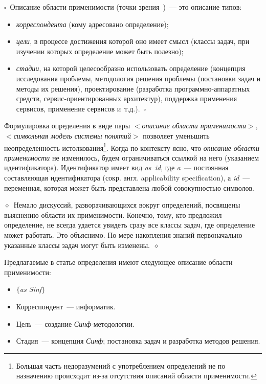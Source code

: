 \begin{multicols}{2}
\noindent
$\square$~Описание области применимости (точки зрения~\cite{7il})~--- это
описание типов:
\begin{itemize}
\item \textit{корреспондента} (кому адресовано определение);
\item \textit{цели}, в процессе достижения которой оно имеет смысл (классы
задач, при изучении которых определение может быть полезно);
\item \textit{стадии}, на которой целесообразно использовать определение
(концепция исследования проблемы, методология решения проблемы
(постановки задач и методы их решения), проектирование (разработка
программно-аппаратных средств, сервис-ориентированных архитектур),
поддержка применения сервисов, применение сервисов и~т.д.).~$\square$
\end{itemize}

Формулировка определения в виде пары $<$\textit{описание области применимости}$>$,
$<$\textit{сим\-воль\-ная модель системы понятий}$>$ позволяет уменьшить неопределенность
истолкования\footnote{Большая часть недоразумений с употреблением определений не по
назначению происходит из-за отсутствия описаний области применимости.}. Когда по контексту
ясно, что \textit{описание области применимости} не изменилось, будем ограничиваться ссылкой на него
(указанием идентификатора). Идентификатор имеет вид \textit{as~id}, где \textit{a}~--- постоянная
составляющая идентификатора (сокр. англ. applicability specification), а \textit{id}~--- переменная, которая
может быть представлена любой совокупностью символов.

\noindent
$\diamond$~Немало дискуссий, разворачивающихся вокруг определений,
посвящены выяснению области их применимости. Конечно, тому, кто
предложил определение, не всегда удается увидеть сразу все классы задач, где
определение может работать. Это объяснимо. По мере накопления знаний
первоначально указанные классы задач могут быть изменены.~$\diamond$

Предлагаемые в статье определения имеют следующее описание области
применимости:
\begin{itemize}\sf
\item[\ ] $\{$\textsl{as Sinf}$\}$ 
\item[\ ] Корреспондент~--- информатик.
\item[\ ] Цель~--- создание \textsl{Синф}-методологии.
\item[\ ] Стадия~--- концепция \textsl{Синф}; постановка задач и разработка методов 
решения. 
\end{itemize}


\end{multicols}
